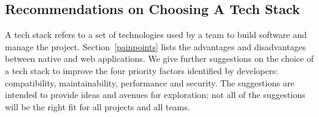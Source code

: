 \documentclass[final, 3p, times, authoryear]{elsarticle}
\begin{document}
\subsection{Recommendations on Choosing A Tech Stack}
\label{sec_recommendations_tech_stack}

A tech stack refers to a set of technologies used by a team to build software
and manage the project. Section~\ref{painpoints} lists the advantages and
disadvantages between native and web applications. We give further suggestions
on the choice of a tech stack to improve the four priority factors identified by
developers: compatibility, maintainability, performance and security.  The
suggestions are intended to provide ideas and avenues for exploration; not all
of the suggestions will be the right fit for all projects and all teams.
\end{document}
